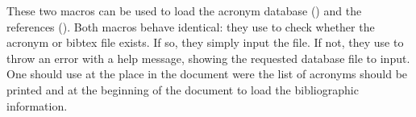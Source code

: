 
\DescribeMacro{\skbacronyms}
\DescribeMacro{\skbbibtex}
These two macros can be used to load the acronym database (\cmd{\skbacronyms}) and the references
(\cmd{\skbbibtex}). Both macros behave identical: they use \cmd{\InputIfFileExists} to check whether
the acronym or bibtex file exists. If so, they simply input the file. If not, they use \cmd{\PackageError} to 
throw an error with a help message, showing the requested database file to input.
One should use \cmd{\skbacronyms} at the place in the document were the list of acronyms should 
be printed and \cmd{\skbbibtex} at the beginning of the document to load the bibliographic information.
